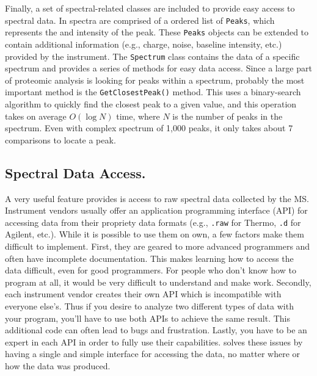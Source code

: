 Finally, a set of spectral-related classes are included to provide easy access to spectral data. In \csmsl{} spectra are comprised of a ordered list of \texttt{Peaks}, which represents the \mz{} and intensity of the peak. These \texttt{Peaks} objects can be extended to contain additional information (e.g., charge, noise, baseline intensity, etc.) provided by the instrument. The \texttt{Spectrum} class contains the data of a specific spectrum and provides a series of methods for easy data access. Since a large part of proteomic analysis is looking for peaks within a spectrum, probably the most important method is the \texttt{GetClosestPeak()} method. This uses a binary-search algorithm to quickly find the closest peak to a given \mz{} value, and this operation takes on average $O(\log N)$ time, where $N$ is the number of peaks in the spectrum. Even with complex spectrum of 1,000 peaks, it only takes about 7 comparisons to locate a peak.

\subsection*{Spectral Data Access.}
A very useful feature \csmsl{} provides is access to raw spectral data collected by the MS. Instrument vendors usually offer an application programming interface (API) for accessing data from their propriety data formats (e.g., \texttt{.raw} for Thermo, \texttt{.d} for Agilent, etc.). While it is possible to use them on own, a few factors make them difficult to implement. First, they are geared to more advanced programmers and often have incomplete documentation. This makes learning how to access the data difficult, even for good programmers. For people who don't know how to program at all, it would be very difficult to understand and make work. Secondly, each instrument vendor creates their own API which is incompatible with everyone else's. Thus if you desire to analyze two different types of data with your program, you'll have to use both APIs to achieve the same result. This additional code can often lead to bugs and frustration. Lastly, you have to be an expert in each API in order to fully use their capabilities. \csmsl{} solves these issues by having a single and simple interface for accessing the data, no matter where or how the data was produced.

